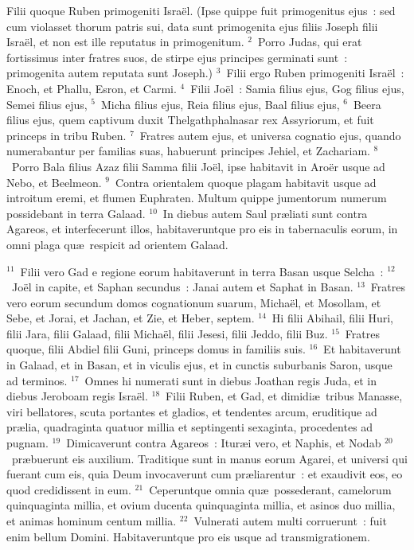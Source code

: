 \lettrine[lines=3,image=true,loversize=0.05,lraise=-0.03]{F}{}ilii quoque Ruben primogeniti Isra\"el. (Ipse quippe fuit primogenitus ejus~: sed cum violasset thorum patris sui, data sunt primogenita ejus filiis Joseph filii Isra\"el, et non est ille reputatus in primogenitum.
${}^{2}$~Porro Judas, qui erat fortissimus inter fratres suos, de stirpe ejus principes germinati sunt~: primogenita autem reputata sunt Joseph.)
${}^{3}$~Filii ergo Ruben primogeniti Isra\"el~: Enoch, et Phallu, Esron, et Carmi.
${}^{4}$~Filii Jo\"el~: Samia filius ejus, Gog filius ejus, Semei filius ejus,
${}^{5}$~Micha filius ejus, Reia filius ejus, Baal filius ejus,
${}^{6}$~Beera filius ejus, quem captivum duxit Thelgathphalnasar rex Assyriorum, et fuit princeps in tribu Ruben.
${}^{7}$~Fratres autem ejus, et universa cognatio ejus, quando numerabantur per familias suas, habuerunt principes Jehiel, et Zachariam.
${}^{8}$~Porro Bala filius Azaz filii Samma filii Jo\"el, ipse habitavit in Aro\"er usque ad Nebo, et Beelmeon.
${}^{9}$~Contra orientalem quoque plagam habitavit usque ad introitum eremi, et flumen Euphraten. Multum quippe jumentorum numerum possidebant in terra Galaad.
${}^{10}$~In diebus autem Saul pr\ae liati sunt contra Agareos, et interfecerunt illos, habitaveruntque pro eis in tabernaculis eorum, in omni plaga qu\ae\ respicit ad orientem Galaad.


${}^{11}$~Filii vero Gad e regione eorum habitaverunt in terra Basan usque Selcha~:
${}^{12}$~Jo\"el in capite, et Saphan secundus~: Janai autem et Saphat in Basan.
${}^{13}$~Fratres vero eorum secundum domos cognationum suarum, Micha\"el, et Mosollam, et Sebe, et Jorai, et Jachan, et Zie, et Heber, septem.
${}^{14}$~Hi filii Abihail, filii Huri, filii Jara, filii Galaad, filii Micha\"el, filii Jesesi, filii Jeddo, filii Buz.
${}^{15}$~Fratres quoque, filii Abdiel filii Guni, princeps domus in familiis suis.
${}^{16}$~Et habitaverunt in Galaad, et in Basan, et in viculis ejus, et in cunctis suburbanis Saron, usque ad terminos.
${}^{17}$~Omnes hi numerati sunt in diebus Joathan regis Juda, et in diebus Jeroboam regis Isra\"el.
${}^{18}$~Filii Ruben, et Gad, et dimidi\ae\ tribus Manasse, viri bellatores, scuta portantes et gladios, et tendentes arcum, eruditique ad pr\ae lia, quadraginta quatuor millia et septingenti sexaginta, procedentes ad pugnam.
${}^{19}$~Dimicaverunt contra Agareos~: Itur\ae i vero, et Naphis, et Nodab
${}^{20}$~pr\ae buerunt eis auxilium. Traditique sunt in manus eorum Agarei, et universi qui fuerant cum eis, quia Deum invocaverunt cum pr\ae liarentur~: et exaudivit eos, eo quod credidissent in eum.
${}^{21}$~Ceperuntque omnia qu\ae\ possederant, camelorum quinquaginta millia, et ovium ducenta quinquaginta millia, et asinos duo millia, et animas hominum centum millia.
${}^{22}$~Vulnerati autem multi corruerunt~: fuit enim bellum Domini. Habitaveruntque pro eis usque ad transmigrationem.


